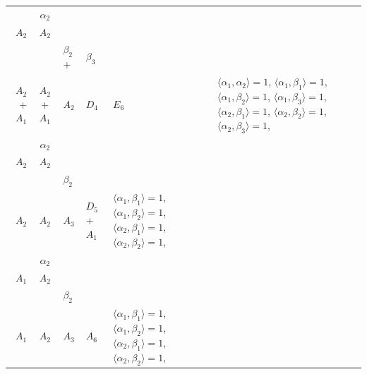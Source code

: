 \documentclass[12pt]{report}
\begin{document}
\begin{appendix}
{\begin{longtable}{rcl p{1cm}p{1cm}p{3cm} }
\\
\begin{tabular}{cc}$\alpha_1$+ & $\alpha_2$\\\tiny{ $A_2$ } & \tiny{ $A_2$ }\end{tabular} &\begin{tabular}{c} = \\~ \end{tabular} & \begin{tabular}{ccc}$\beta_1$+ & $\beta_2$+ & $\beta_3$\\\tiny{ $A_2$+$A_1$ } & \tiny{ $A_2$+$A_1$ } & \tiny{ $A_2$ }\end{tabular} & $D_4$ & $E_6$ & $\langle\alpha_1, \alpha_2\rangle=1$,  $\langle\alpha_1, \beta_1\rangle=1$, $\langle\alpha_1, \beta_2\rangle=1$, $\langle\alpha_1, \beta_3\rangle=1$, $\langle\alpha_2, \beta_1\rangle=1$, $\langle\alpha_2, \beta_2\rangle=1$, $\langle\alpha_2, \beta_3\rangle=1$, 
\\
\begin{tabular}{cc}$\alpha_1$+ & $\alpha_2$\\\tiny{ $A_2$ } & \tiny{ $A_2$ }\end{tabular} &\begin{tabular}{c} = \\~ \end{tabular} & \begin{tabular}{cc}$\beta_1$+ & $\beta_2$\\\tiny{ $A_2$ } & \tiny{ $A_2$ }\end{tabular} & $A_3$ & $D_5$+$A_1$ &  $\langle\alpha_1, \beta_1\rangle=1$, $\langle\alpha_1, \beta_2\rangle=1$, $\langle\alpha_2, \beta_1\rangle=1$, $\langle\alpha_2, \beta_2\rangle=1$, 
\\
\begin{tabular}{cc}$\alpha_1$+ & $\alpha_2$\\\tiny{ $A_1$ } & \tiny{ $A_2$ }\end{tabular} &\begin{tabular}{c} = \\~ \end{tabular} & \begin{tabular}{cc}$\beta_1$+ & $\beta_2$\\\tiny{ $A_1$ } & \tiny{ $A_2$ }\end{tabular} & $A_3$ & $A_6$ &  $\langle\alpha_1, \beta_1\rangle=1$, $\langle\alpha_1, \beta_2\rangle=1$, $\langle\alpha_2, \beta_1\rangle=1$, $\langle\alpha_2, \beta_2\rangle=1$, 
\\

\end{longtable}}
\end{appendix}
\end{document}
